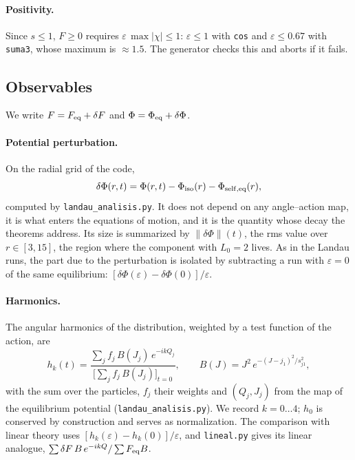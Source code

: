 \documentclass[11pt,a4paper]{article}
\begin{document}
\paragraph{Positivity.} Since $s\le1$, $F\ge0$ requires $\varepsilon\,\max|\chi|\le1$:
$\varepsilon\le1$ with \texttt{cos} and $\varepsilon\le0.67$ with \texttt{suma3}, whose maximum is
$\approx1.5$. The generator checks this and aborts if it fails.

\subsection{Observables}
\label{sec:observables}
\label{sec:dphi}
\label{sec:hk}
\label{sec:obslineal}

We write $F=F_{\rm eq}+\delta F$ and $\Phi=\Phi_{\rm eq}+\delta\Phi$.

\paragraph{Potential perturbation.} On the radial grid of the code,
\[
  \delta\Phi(r,t) = \Phi(r,t) - \Phi_{\rm iso}(r) - \Phi_{\rm self,eq}(r),
\]
computed by \texttt{landau\_\allowbreak analisis.py}. It does not depend on any angle--action
map, it is what enters the equations of motion, and it is the quantity whose decay the
theorems address. Its size is summarized by $\|\delta\Phi\|(t)$, the rms value over
$r\in[3,15]$, the region where the component with $L_0=2$ lives. As in the Landau runs,
the part due to the perturbation is isolated by subtracting a run with $\varepsilon=0$ of
the same equilibrium: $[\delta\Phi(\varepsilon)-\delta\Phi(0)]/\varepsilon$.

\paragraph{Harmonics.} The angular harmonics of the distribution, weighted by a test
function of the action, are
\[
  h_k(t) = \frac{\sum_j f_j\,B(J_j)\,e^{-ikQ_j}}{\big[\sum_j f_j\,B(J_j)\big]_{t=0}},
  \qquad
  B(J)=J^2\,e^{-(J-j_1)^2/s_{j1}^2},
\]
with the sum over the particles, $f_j$ their weights and $(Q_j,J_j)$ from the map of the
equilibrium potential (\texttt{landau\_\allowbreak analisis.py}). We record $k=0\ldots4$; $h_0$ is
conserved by construction and serves as normalization. The comparison with linear
theory uses $[h_k(\varepsilon)-h_k(0)]/\varepsilon$, and \texttt{lineal.py} gives its linear
analogue, $\sum\delta F\,B\,e^{-ikQ}/\sum F_{\rm eq}B$.
\end{document}

